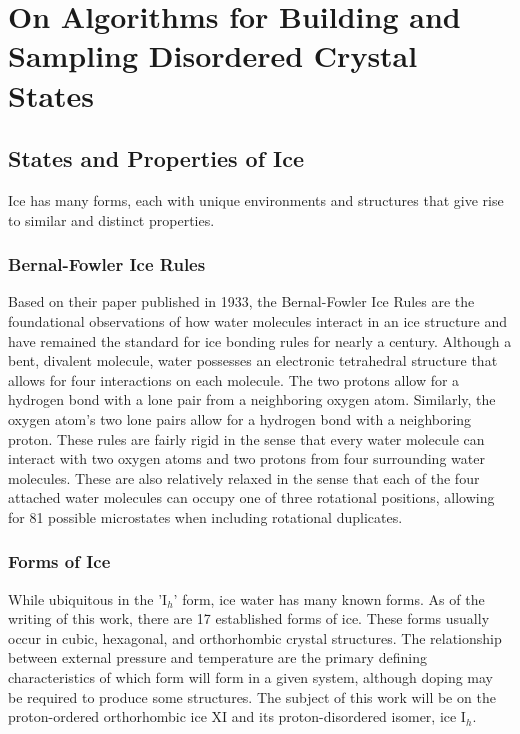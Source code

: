 \chapter{On Algorithms for Building and Sampling Disordered Crystal States}
\label{ch:iceXI}

\section{States and Properties of Ice}

Ice has many forms, each with unique environments and structures that give rise to similar and distinct properties. 

\subsection{Bernal-Fowler Ice Rules}

Based on their paper published in 1933, the Bernal-Fowler Ice Rules are the foundational observations of how water molecules interact in an ice structure and have remained the standard for ice bonding rules for nearly a century.
Although a bent, divalent molecule, water possesses an electronic tetrahedral structure that allows for four interactions on each molecule.
The two protons allow for a hydrogen bond with a lone pair from a neighboring oxygen atom.
Similarly, the oxygen atom's two lone pairs allow for a hydrogen bond with a neighboring proton. 
These rules are fairly rigid in the sense that every water molecule can interact with two oxygen atoms and two protons from four surrounding water molecules.
These are also relatively relaxed in the sense that each of the four attached water molecules can occupy one of three rotational positions, allowing for 81 possible microstates when including rotational duplicates.

\subsection{Forms of Ice}

While ubiquitous in the 'I$_{h}$' form, ice water has many known forms.
As of the writing of this work, there are 17 established forms of ice. 
These forms usually occur in cubic, hexagonal, and orthorhombic crystal structures.
The relationship between external pressure and temperature are the primary defining characteristics of which form will form in a given system, although doping may be required to produce some structures.
The subject of this work will be on the proton-ordered orthorhombic ice XI and its proton-disordered isomer, ice I$_{h}$.

